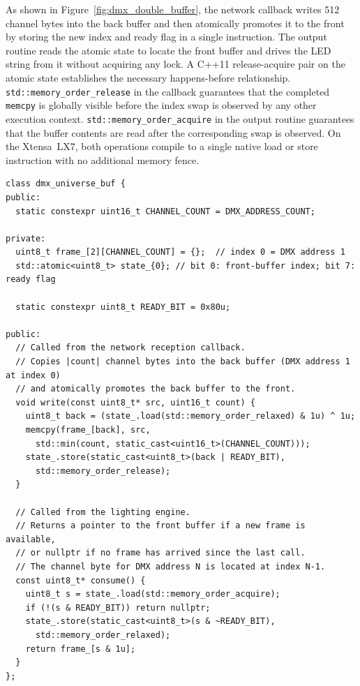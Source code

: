 As shown in Figure~\ref{fig:dmx_double_buffer}, the network callback writes \num{512} channel bytes into the back buffer and then atomically promotes it to the front by storing the new index and ready flag in a single instruction.
The output routine reads the atomic state to locate the front buffer and drives the \ac{LED} string from it without acquiring any lock.
A C++11 release-acquire pair on the atomic state establishes the necessary happens-before relationship.
\texttt{std::memory\_order\_release} in the callback guarantees that the completed \texttt{memcpy} is globally visible before the index swap is observed by any other execution context.
\texttt{std::memory\_order\_acquire} in the output routine guarantees that the buffer contents are read after the corresponding swap is observed.
On the Xtensa~LX7, both operations compile to a single native load or store instruction with no additional memory fence.

\begin{longlisting}
\begin{verbatim}
class dmx_universe_buf {
public:
  static constexpr uint16_t CHANNEL_COUNT = DMX_ADDRESS_COUNT;

private:
  uint8_t frame_[2][CHANNEL_COUNT] = {};  // index 0 = DMX address 1
  std::atomic<uint8_t> state_{0}; // bit 0: front-buffer index; bit 7: ready flag

  static constexpr uint8_t READY_BIT = 0x80u;

public:
  // Called from the network reception callback.
  // Copies |count| channel bytes into the back buffer (DMX address 1 at index 0)
  // and atomically promotes the back buffer to the front.
  void write(const uint8_t* src, uint16_t count) {
    uint8_t back = (state_.load(std::memory_order_relaxed) & 1u) ^ 1u;
    memcpy(frame_[back], src,
      std::min(count, static_cast<uint16_t>(CHANNEL_COUNT)));
    state_.store(static_cast<uint8_t>(back | READY_BIT),
      std::memory_order_release);
  }

  // Called from the lighting engine.
  // Returns a pointer to the front buffer if a new frame is available,
  // or nullptr if no frame has arrived since the last call.
  // The channel byte for DMX address N is located at index N-1.
  const uint8_t* consume() {
    uint8_t s = state_.load(std::memory_order_acquire);
    if (!(s & READY_BIT)) return nullptr;
    state_.store(static_cast<uint8_t>(s & ~READY_BIT),
      std::memory_order_relaxed);
    return frame_[s & 1u];
  }
};
\end{verbatim}
\caption{\texttt{dmx\_universe\_buf}: double-buffered \ac{DMX} frame store with atomic index swap.}
\label{lst:dmx_universe_buf}
\end{longlisting}

